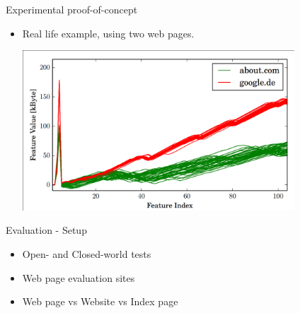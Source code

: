\documentclass{beamer}
\begin{document}
\begin{frame}{Experimental proof-of-concept}
\begin{itemize}
\item Real life example, using two web pages.

\includegraphics[width=0.8\textwidth,trim={0.1cm 0 0 0.1cm},clip]{poc}

\end{itemize}
\end{frame}


\begin{frame}{Evaluation - Setup}
\begin{itemize}
\item Open- and Closed-world tests
\item Web page evaluation sites
\item Web page vs Website vs Index page
\end{itemize}
\end{frame}
\end{document}
